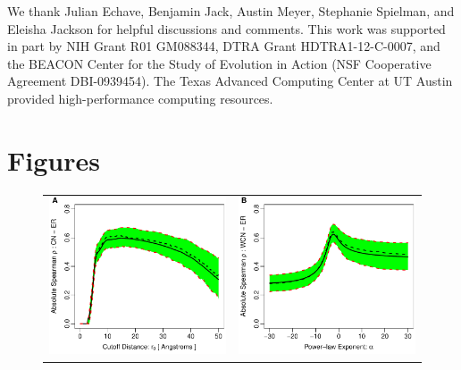 \documentclass[12pt]{article}
\begin{document}
We thank Julian Echave, Benjamin Jack, Austin Meyer, Stephanie Spielman, and Eleisha Jackson for helpful discussions and comments. This work was supported in part by NIH Grant R01 GM088344, DTRA Grant HDTRA1-12-C-0007, and the BEACON Center for the Study of Evolution in Action (NSF Cooperative Agreement DBI-0939454). The Texas Advanced Computing Center at UT Austin provided high-performance computing resources.





\cleardoublepage
\section*{Figures}
    \begin{figure}[h]
        \begin{center}
        \begin{tabular}{cc}
            \includegraphics[width=3.1in]{spcor_cnSC_r4sJC.pdf} & \includegraphics[width=3.1in]{spcor_cnwSC_r4sJC.pdf}
        \end{tabular}
        \end{center}

\end{figure}
\end{document}
